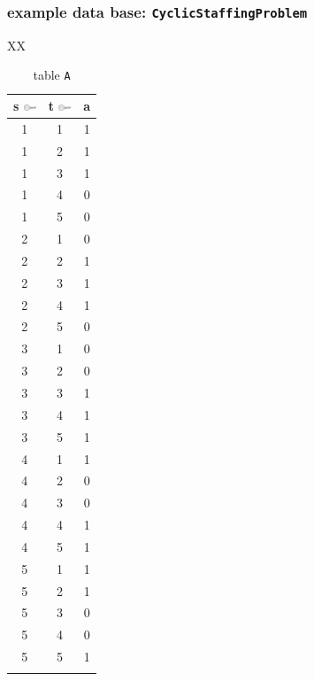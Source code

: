 \begin{frame}
 \frametitle{example data base: \texttt{CyclicStaffingProblem}}
 \begin{table}[htbp]\tiny
 \begin{tabularx}{\linewidth}{XX}
  \begin{minipage}{\linewidth}
   \begin{subtable}[b]{\linewidth}
     \centering
     \begin{tabular}{ccc}
      \toprule
      \ttfamily s \includegraphics[width=1em]{Bilder/Key} & \ttfamily t \includegraphics[width=1em]{Bilder/Key} & \ttfamily a \\
      \midrule
      \arrayrulecolor{gray!30}
      1 & 1 & 1 \\
      1 & 2 & 1 \\
      1 & 3 & 1 \\
      1 & 4 & 0 \\
      1 & 5 & 0 \\
      \midrule
      2 & 1 & 0 \\
      2 & 2 & 1 \\
      2 & 3 & 1 \\
      2 & 4 & 1 \\
      2 & 5 & 0 \\
      \midrule
      3 & 1 & 0 \\
      3 & 2 & 0 \\
      3 & 3 & 1 \\
      3 & 4 & 1 \\
      3 & 5 & 1 \\
      \midrule
      4 & 1 & 1 \\
      4 & 2 & 0 \\
      4 & 3 & 0 \\
      4 & 4 & 1 \\
      4 & 5 & 1 \\
      \midrule
      5 & 1 & 1 \\
      5 & 2 & 1 \\
      5 & 3 & 0 \\
      5 & 4 & 0 \\
      5 & 5 & 1 \\
      \arrayrulecolor{black}
      \bottomrule
     \end{tabular}
    \caption{table \texttt{A}}

\end{subtable}
\end{minipage}
\end{tabularx}
\end{table}
\end{frame}
